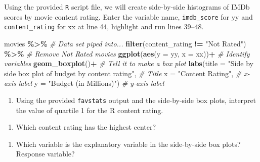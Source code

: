 \documentclass[
]{report}
\newenvironment{Shaded}{\begin{snugshade}}{\end{snugshade}}
\newcommand{\CommentTok}[1]{\textcolor[rgb]{0.56,0.35,0.01}{\textit{#1}}}
\newcommand{\DataTypeTok}[1]{\textcolor[rgb]{0.13,0.29,0.53}{#1}}
\newcommand{\KeywordTok}[1]{\textcolor[rgb]{0.13,0.29,0.53}{\textbf{#1}}}
\newcommand{\NormalTok}[1]{#1}
\newcommand{\OperatorTok}[1]{\textcolor[rgb]{0.81,0.36,0.00}{\textbf{#1}}}
\newcommand{\StringTok}[1]{\textcolor[rgb]{0.31,0.60,0.02}{#1}}
\providecommand{\tightlist}{%
  \setlength{\itemsep}{0pt}\setlength{\parskip}{0pt}}
\begin{document}
Using the provided \texttt{R} script file, we will create side-by-side histograms of IMDb scores by movie content rating. Enter the variable name, \texttt{imdb\_score} for yy and \texttt{content\_rating} for xx at line 44, highlight and run lines 39--48.

\begin{Shaded}
\begin{Highlighting}[]
\NormalTok{movies }\OperatorTok{\%\textgreater{}\%}\StringTok{  }\CommentTok{\# Data set piped into...}
\StringTok{  }\KeywordTok{filter}\NormalTok{(content\_rating }\OperatorTok{!=}\StringTok{ "Not Rated"}\NormalTok{) }\OperatorTok{\%\textgreater{}\%}\StringTok{ }\CommentTok{\# Remove Not Rated movies}
\StringTok{  }\KeywordTok{ggplot}\NormalTok{(}\KeywordTok{aes}\NormalTok{(}\DataTypeTok{y =}\NormalTok{ yy, }\DataTypeTok{x =}\NormalTok{ xx))}\OperatorTok{+}\StringTok{  }\CommentTok{\# Identify variables}
\StringTok{  }\KeywordTok{geom\_boxplot}\NormalTok{()}\OperatorTok{+}\StringTok{  }\CommentTok{\# Tell it to make a box plot}
\StringTok{  }\KeywordTok{labs}\NormalTok{(}\DataTypeTok{title =} \StringTok{"Side by side box plot of budget by content rating"}\NormalTok{,  }\CommentTok{\# Title}
       \DataTypeTok{x =} \StringTok{"Content Rating"}\NormalTok{,    }\CommentTok{\# x{-}axis label}
       \DataTypeTok{y =} \StringTok{"Budget (in Millions)"}\NormalTok{)  }\CommentTok{\# y{-}axis label}
\end{Highlighting}
\end{Shaded}

\begin{enumerate}
\def\labelenumi{\arabic{enumi}.}
\tightlist
\item
  Using the provided \texttt{favstats} output and the side-by-side box plots, interpret the value of quartile 1 for the R content rating.
\end{enumerate}

\vspace{1in}

\begin{enumerate}
\def\labelenumi{\arabic{enumi}.}
\setcounter{enumi}{1}
\tightlist
\item
  Which content rating has the highest center?
\end{enumerate}

\vspace{0.2in}

\begin{enumerate}
\def\labelenumi{\arabic{enumi}.}
\setcounter{enumi}{2}
\tightlist
\item
  Which variable is the explanatory variable in the side-by-side box plots? Response variable?
\end{enumerate}
\end{document}
